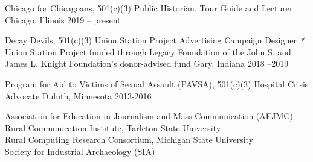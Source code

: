 \begin{cvhonors}
  \cvhonor
    {Chicago for Chicagoans, 501(c)(3) } 
    {Public Historian, Tour Guide and Lecturer } 
    {Chicago, Illinois} 
    {2019 -- present} 

  \cvhonor
    {Decay Devils, 501(c)(3) } %
    {Union Station Project Advertising Campaign Designer \scriptsize{\textit{*} Union Station Project funded through Legacy Foundation of the John S. and James L. Knight Foundation's donor-advised fund}} %
    {Gary, Indiana} %
    {2018 --2019} %
    
  \cvhonor
    {Program for Aid to Victims of Sexual Assault (PAVSA), 501(c)(3) } 
    {Hospital Crisis Advocate} 
    {Duluth, Minnesota} 
    {2013-2016} 
\end{cvhonors}

\begin{small} \color{black}

Association for Education in Journalism and Mass Communication (AEJMC)  \\
Rural Communication Institute, Tarleton State University \\
Rural Computing Research Consortium, Michigan State University \\
Society for Industrial Archaeology (SIA) \\
\end{small}





